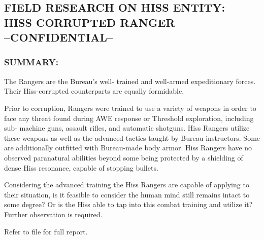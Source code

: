 \subsection*{FIELD RESEARCH ON HISS ENTITY:\\
	HISS CORRUPTED RANGER\\
	--CONFIDENTIAL--}
\subsubsection*{SUMMARY:}
\par The Rangers are the Bureau's well-
trained and well-armed expeditionary
forces. Their Hiss-corrupted
counterparts are equally formidable.
\par Prior to corruption, Rangers were trained
to use a variety of weapons in order to face any threat found
during AWE response or Threshold exploration, including sub-
machine guns, assault rifles, and automatic shotguns. Hiss
Rangers utilize these weapons as well as the advanced tactics
taught by Bureau instructors. Some are additionally outfitted with
Bureau-made body armor. Hiss Rangers have no observed
paranatural abilities beyond some being protected by a shielding
of dense Hiss resonance, capable of stopping bullets.
\par Considering the advanced training the Hiss Rangers are capable
of applying to their situation, is it feasible to consider the human
mind still remains intact to some degree? Or is the Hiss able to
tap into this combat training and utilize it? Further observation is
required.
\par Refer to file  for full report.
